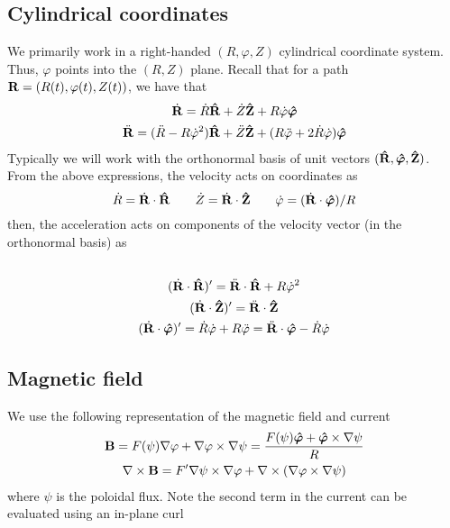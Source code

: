 \documentclass[]{article}
\begin{document}
\subsection{Cylindrical coordinates}
We primarily work in a right-handed \((R,\varphi,Z)\) cylindrical coordinate system.
Thus, \(\varphi\) points into the \((R,Z)\) plane.
Recall that for a path \(\vb{R} = (R(t), \varphi(t), Z(t))\), we have that
\begin{gather*}
	\dot{\vb{R}} = \dot{R} \vu{R} + \dot{Z} \vu{Z} + R \dot{\varphi} \vu*{\varphi} \\
	\ddot{\vb{R}} = (\ddot{R} - R \dot{\varphi}^2) \vu{R} + \ddot{Z} \vu{Z} + (R \ddot{\varphi} + 2 \dot{R} \dot{\varphi}) \vu*{\varphi}
\end{gather*}
Typically we will work with the orthonormal basis of unit vectors \((\vu{R}, \vu*{\varphi}, \vu{Z})\).
From the above expressions, the velocity acts on coordinates as
\begin{equation*}
	\dot{R} = \dot{\vb{R}} \cdot \vu{R} \qquad
	\dot{Z} = \dot{\vb{R}} \cdot \vu{Z} \qquad
	\dot{\varphi} = (\dot{\vb{R}} \cdot \vu*{\varphi}) / R
\end{equation*}
then, the acceleration acts on components of the velocity vector (in the orthonormal basis) as
\begin{gather*}
	 \\
	(\dot{\vb{R}} \cdot \vu{R})' = \ddot{\vb{R}}\cdot \vu{R} + R \dot{\varphi}^2 \\
	(\dot{\vb{R}} \cdot \vu{Z})' = \ddot{\vb{R}} \cdot \vu{Z} \\
	(\dot{\vb{R}} \cdot \vu*{\varphi})' = \dot{R} \dot{\varphi} + R \ddot{\varphi} = \ddot{\vb{R}} \cdot \vu*{\varphi} - \dot{R}\dot{\varphi}
\end{gather*}

\subsection{Magnetic field}
We use the following representation of the magnetic field and current
\begin{gather*}
	\vb{B} = F(\psi) \nabla \varphi + \nabla \varphi \times \nabla \psi = \frac{F(\psi) \vu*{\varphi} + \vu*{\varphi} \times \nabla \psi}{R} \\
	\nabla \times \vb{B} = F' \nabla \psi \times \nabla \varphi + \nabla \times (\nabla \varphi \times \nabla \psi)
\end{gather*}
where \(\psi\) is the poloidal flux.
Note the second term in the current can be evaluated using an in-plane curl
\end{document}

